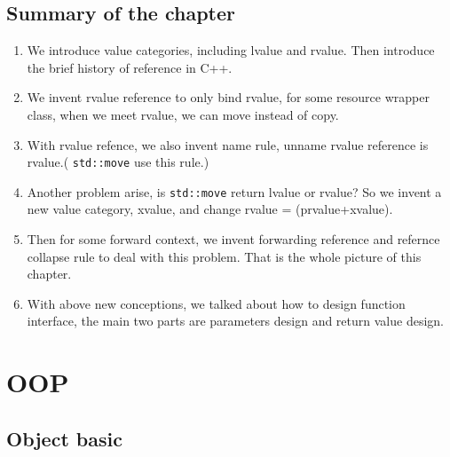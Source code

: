 \documentclass[a4paper,11pt,twoside]{book}
\begin{document}
\section{Summary of the chapter}
\begin{enumerate}
		\item We introduce value categories, including lvalue and rvalue. Then introduce the brief history of reference in C++.
		\item We invent rvalue reference to only bind rvalue, for some resource wrapper class, when we meet rvalue, we can move instead of copy.
		\item With rvalue refence, we also invent name rule, unname rvalue reference is rvalue.( \texttt{std::move} use this rule.) 
		\item Another problem arise, is \texttt{std::move} return lvalue or rvalue? So we invent a new value category, xvalue, and change rvalue = (prvalue+xvalue).

		\item Then for some forward context, we invent forwarding reference and refernce collapse rule to deal with this problem. That is the whole picture of this chapter.
				
		\item With above new conceptions, we talked about how to design function interface, the main two parts are parameters design and return value design. 
\end{enumerate}


\chapter{OOP}

\section{Object basic}
\end{document}
